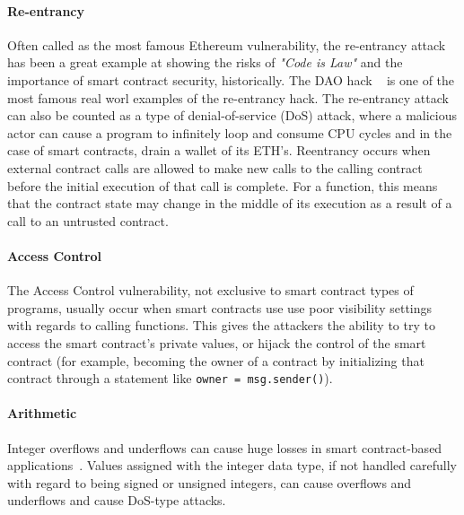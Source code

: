             \paragraph{Re-entrancy}
            Often called as the most famous Ethereum vulnerability, the re-entrancy attack has been a great example at showing the risks of \textit{"Code is Law"} and the importance of smart contract security, historically.
            The DAO hack ~\cite{dhillon2017dao} is one of the most famous real worl examples of the re-entrancy hack.
            The re-entrancy attack can also be counted as a type of denial-of-service (DoS) attack, where a malicious actor can cause a program to infinitely loop and consume CPU cycles and in the case of smart contracts, drain a wallet of its ETH's.
            Reentrancy occurs when external contract calls are allowed to make new calls to the calling contract before the initial execution of that call is complete.
            For a function, this means that the contract state may change in the middle of its execution as a result of a call to an untrusted contract. ~\cite{dasp}

            \paragraph{Access Control}
            The Access Control vulnerability, not exclusive to smart contract types of programs, usually occur when smart contracts use use poor visibility settings with regards to calling functions.
            This gives the attackers the ability to try to access the smart contract's private values, or hijack the control of the smart contract (for example, becoming the owner of a contract by initializing that contract through a statement like \texttt{owner = msg.sender()}).

            \paragraph{Arithmetic}
            Integer overflows and underflows can cause huge losses in smart contract-based applications~\cite{arithmeticVuln}.
            Values assigned with the integer data type, if not handled carefully with regard to being signed or unsigned integers, can cause overflows and underflows and cause DoS-type attacks.
            
